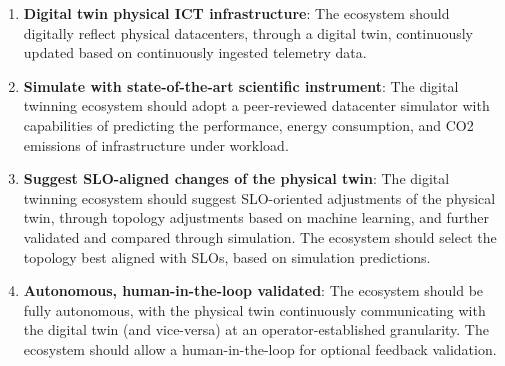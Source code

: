 \begin{enumerate}[label=\textbf{(FR\arabic*)},leftmargin=0pt,itemindent=3em]
    \item \label{design:fr1} \textbf{Digital twin physical ICT infrastructure}: The ecosystem should digitally reflect physical datacenters, through a digital twin, continuously updated based on continuously ingested telemetry data. 
    \item \label{design:fr2} \textbf{Simulate with state-of-the-art scientific instrument}: The digital twinning ecosystem should adopt a peer-reviewed datacenter simulator with capabilities of predicting the performance, energy consumption, and CO2 emissions of infrastructure under workload.
    \item \label{design:fr3} \textbf{Suggest SLO-aligned changes of the physical twin}: The digital twinning ecosystem should suggest SLO-oriented adjustments of the physical twin, through topology adjustments based on machine learning, and further validated and compared through simulation. The ecosystem should select the topology best aligned with SLOs, based on simulation predictions.
    \item \label{design:fr4} \textbf{Autonomous, human-in-the-loop validated}: The ecosystem should be fully autonomous, with the physical twin continuously communicating with the digital twin (and vice-versa) at an operator-established granularity. The ecosystem should allow a human-in-the-loop for optional feedback validation.

\end{enumerate}

